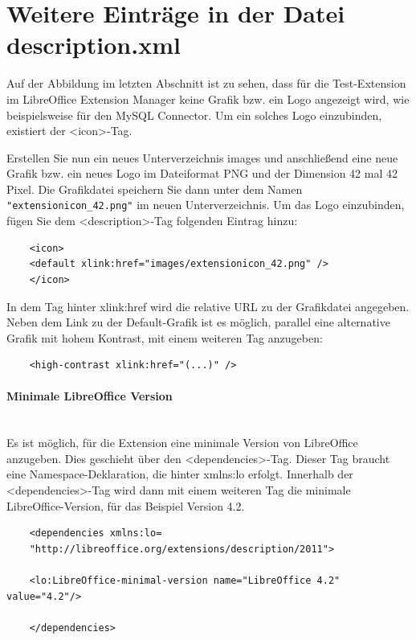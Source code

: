 \documentclass[12pt,a4paper,titlepage]{book}
\begin{document}
\section{Weitere Einträge in der Datei description.xml}\label{weitere_eintraege_description}

Auf der Abbildung im letzten Abschnitt ist zu sehen, dass für die Test-Extension im LibreOffice Extension Manager keine Grafik bzw. ein Logo angezeigt wird, wie beispielsweise für den MySQL Connector. Um ein solches Logo einzubinden, existiert der <icon>-Tag.

Erstellen Sie nun ein neues Unterverzeichnis \glqq images \grqq und anschließend eine neue Grafik bzw. ein neues Logo im Dateiformat PNG und der Dimension 42 mal 42 Pixel. Die Grafikdatei speichern Sie dann unter dem Namen \verb|"extensionicon_42.png"| im neuen Unterverzeichnis. Um das Logo einzubinden, fügen Sie dem <description>-Tag folgenden Eintrag hinzu:

\begin{lstlisting}
	<icon>
	<default xlink:href="images/extensionicon_42.png" />
	</icon>
\end{lstlisting}

In dem Tag hinter \glqq xlink:href \grqq wird die relative URL zu der Grafikdatei angegeben. Neben dem Link zu der Default-Grafik ist es möglich, parallel eine alternative Grafik mit hohem Kontrast, mit einem weiteren Tag anzugeben:
\begin{lstlisting}
	<high-contrast xlink:href="(...)" />
\end{lstlisting}

\paragraph*{Minimale LibreOffice Version}$~~$\\

Es ist möglich, für die Extension eine minimale Version von LibreOffice anzugeben. Dies geschieht über den <dependencies>-Tag. Dieser Tag braucht eine Namespace-Deklaration, die hinter \glqq xmlns:lo \grqq erfolgt. Innerhalb der <dependencies>-Tag wird dann mit einem weiteren Tag die minimale LibreOffice-Version, für das Beispiel Version 4.2.

\begin{lstlisting}
	<dependencies xmlns:lo=
	"http://libreoffice.org/extensions/description/2011">
	
	<lo:LibreOffice-minimal-version name="LibreOffice 4.2" value="4.2"/>
	
	</dependencies>
\end{lstlisting}
\end{document}
